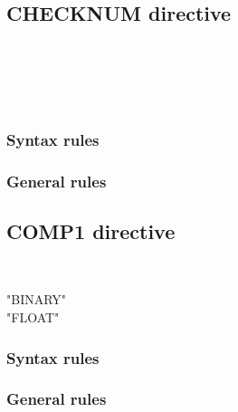 \subsection{CHECKNUM directive}

\begin{syntax}[\miscextcolour]
  \begin{1=}
     \\
  \end{1=}
\end{syntax}

\begin{syntax}[\miscextcolour]
  \begin{1=}
     \\
     \\
  \end{1=}
\end{syntax}

\subsubsection{Syntax rules}

\subsubsection{General rules}

\subsection{COMP1 directive}

\begin{syntax}[\miscextcolour]
  \begin{1=}
     \\
  \end{1=}
  \begin{1=}
    "BINARY" \\
    "FLOAT"
  \end{1=}
\end{syntax}

\subsubsection{Syntax rules}

\subsubsection{General rules}

